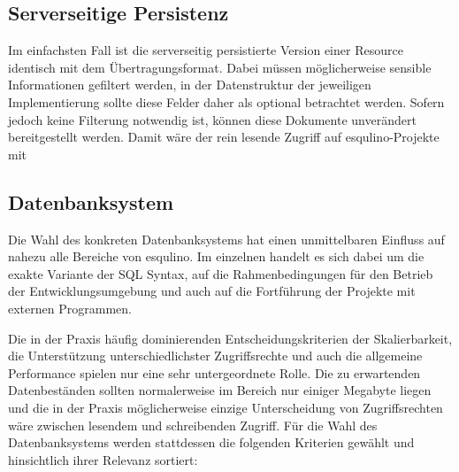 \subsection{Serverseitige Persistenz}
\label{sec:implementation-persistence}

Im einfachsten Fall ist die serverseitig persistierte Version einer Resource identisch mit dem Übertragungsformat. Dabei müssen möglicherweise sensible Informationen gefiltert werden, in der Datenstruktur der jeweiligen Implementierung sollte diese Felder daher als optional betrachtet werden. Sofern jedoch keine Filterung notwendig ist, können diese Dokumente unverändert bereitgestellt werden. Damit wäre der rein lesende Zugriff auf esqulino-Projekte mit

\subsection{Datenbanksystem}
\label{sec:implementation-database-system}

Die Wahl des konkreten Datenbanksystems hat einen unmittelbaren Einfluss auf nahezu alle Bereiche von esqulino. Im einzelnen handelt es sich dabei um die exakte Variante der SQL Syntax, auf die Rahmenbedingungen für den Betrieb der Entwicklungsumgebung und auch auf die Fortführung der Projekte mit externen Programmen.

Die in der Praxis häufig dominierenden Entscheidungskriterien der Skalierbarkeit, die Unterstützung unterschiedlichster Zugriffsrechte und auch die allgemeine Performance spielen nur eine sehr untergeordnete Rolle. Die zu erwartenden Datenbeständen sollten normalerweise im Bereich nur einiger Megabyte liegen und die in der Praxis möglicherweise einzige Unterscheidung von Zugriffsrechten wäre zwischen lesendem und schreibenden Zugriff. Für die Wahl des Datenbanksystems werden stattdessen die folgenden Kriterien gewählt und hinsichtlich ihrer Relevanz sortiert:

